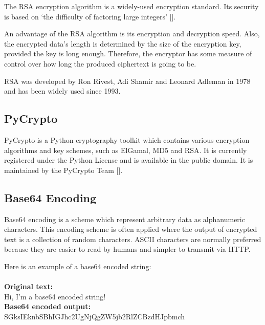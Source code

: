 The RSA encryption algorithm is a widely-used encryption standard. Its security is based
on `the difficulty of factoring large integers' [\cite{website:elgamal}]. 

An advantage of the RSA algorithm is its encryption and decryption speed. Also, the
encrypted data's length is determined by the size of the encryption key, provided the
key is long enough. Therefore, the encryptor has some measure of control over how long the
produced ciphertext is going to be.

RSA was developed by Ron Rivest, Adi Shamir and Leonard Adleman in 1978 and has
been widely used since 1993. 

\subsection{PyCrypto}

PyCrypto is a Python cryptography toolkit which contains various encryption algorithms and
key schemes, such as ElGamal, MD5 and RSA. It is currently registered under the
Python License and is available in the public domain. It is maintained by the
PyCrypto Team [\cite{website:pycrypto}].

\subsection{Base64 Encoding}
\label{sec:base64}

Base64 encoding is a scheme which represent arbitrary data as alphanumeric
characters. This encoding scheme is often applied where the output of encrypted
text is a collection of random characters. ASCII characters are normally
preferred because they are easier to read by humans and simpler to transmit via
HTTP. 

Here is an example of a base64 encoded string:\\\\
\textbf{Original text:}\\
Hi, I'm a base64 encoded string!\\
\textbf{Base64 encoded output:}\\
SGksIEknbSBhIGJhc2UgNjQgZW5jb2RlZCBzdHJpbmch
